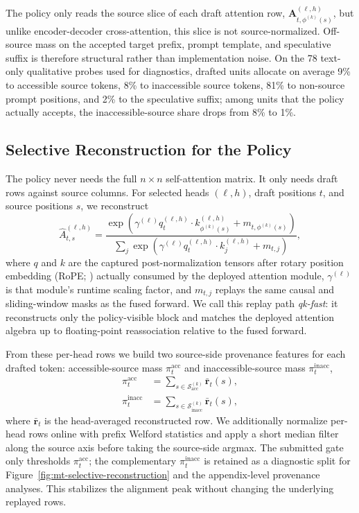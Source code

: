 \documentclass[11pt]{article}
\begin{document}
The policy only reads the source slice of each draft attention row,
$\mathbf{A}^{(\ell,h)}_{t,\phi^{(k)}(s)}$, but unlike encoder-decoder
cross-attention, this slice is not source-normalized. Off-source mass on the
accepted target prefix, prompt template, and speculative suffix is therefore
structural rather than implementation noise. On the 78 text-only qualitative
probes used for diagnostics, drafted units allocate on average 9\%
to accessible source tokens, 8\% to inaccessible source tokens, 81\% to
non-source prompt positions, and 2\% to the speculative suffix; among units
that the policy actually accepts, the inaccessible-source share drops from 8\%
to 1\%.

\subsection{Selective Reconstruction for the Policy}

The policy never needs the full $n\times n$ self-attention matrix. It only
needs draft rows against source columns. For selected heads $(\ell,h)$, draft
positions $t$, and source positions $s$, we reconstruct
\begin{equation}
\widehat{A}^{(\ell,h)}_{t,s}
=
\frac{\exp\!\left(
\gamma^{(\ell)} q^{(\ell,h)}_t \cdot k^{(\ell,h)}_{\phi^{(k)}(s)}
  + m_{t,\phi^{(k)}(s)}
\right)}
{\sum_j \exp\!\left(
\gamma^{(\ell)} q^{(\ell,h)}_t \cdot k^{(\ell,h)}_j + m_{t,j}
\right)},
\label{eq:mt-qk-fast}
\end{equation}
where $q$ and $k$ are the captured post-normalization tensors after rotary
position embedding (RoPE; \citealp{su2021roformer}) actually consumed by the
deployed attention module, $\gamma^{(\ell)}$ is that
module's runtime scaling factor, and $m_{t,j}$ replays the same causal and
sliding-window masks as the fused forward. We call this replay path
\emph{qk-fast}: it reconstructs only the policy-visible block and matches the
deployed attention algebra up to floating-point reassociation relative to the
fused forward.



From these per-head rows we build two source-side provenance features for each
drafted token: accessible-source mass $\pi_t^{\mathrm{acc}}$ and
inaccessible-source mass $\pi_t^{\mathrm{inacc}}$,
\begin{align}
  \pi_t^{\mathrm{acc}}
  &=
  \sum_{s \in \mathcal{S}^{(k)}_{\mathrm{acc}}} \bar{\mathbf{r}}_t(s),
  \label{eq:mt-prov-acc}\\
  \pi_t^{\mathrm{inacc}}
  &=
  \sum_{s \in \mathcal{S}^{(k)}_{\mathrm{inacc}}} \bar{\mathbf{r}}_t(s),
  \label{eq:mt-provenance}
\end{align}
where $\bar{\mathbf{r}}_t$ is the head-averaged reconstructed row. We
additionally normalize per-head rows online with prefix Welford statistics and
apply a short median filter along the source axis before taking the source-side
argmax. The submitted gate only thresholds $\pi_t^{\mathrm{acc}}$; the
complementary $\pi_t^{\mathrm{inacc}}$ is retained as a diagnostic split for
Figure~\ref{fig:mt-selective-reconstruction} and the appendix-level provenance
analyses. This stabilizes the alignment peak without changing the underlying
replayed rows.
\end{document}
